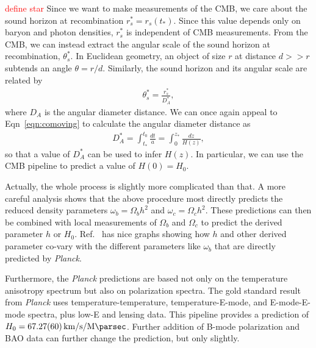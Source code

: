 \documentclass[12pt]{article}
\newcommand{\units}{\kilo\meter\per\second\per\mega\parsec}
\newcommand{\hnaught}[1]{\SI{#1}{\units}}
\newcommand{\note}[1]{\textcolor{red}{#1}}
\newcommand{\Planck}[1]{\textit{Planck}}
\begin{document}
\note{define star}
Since we want to make measurements of the CMB, we care about the sound horizon at recombination $r_s^*=r_s(t_*)$. Since this value depends only on baryon and photon densities, $r^*_s$ is independent of CMB measurements. From the CMB, we can instead extract the angular scale of the sound horizon at recombination, $\theta_s^*$. 
In Euclidean geometry, an object of size $r$ at distance $d>>r$ subtends an angle $\theta = r/d$.
Similarly, the sound horizon and its angular scale are related by
\begin{align}
\theta_s^* = \frac{r_s^*}{D_A^*},
\end{align}
where $D_A$ is the angular diameter distance.
We can once again appeal to Eqn~\ref{eqn:comoving} to calculate the angular diameter distance as~\cite{Samtleben2007, DiValentino2021}
\begin{align}
D_A^* = \int_{t_*}^{t_0}\frac{dt}{a} =  \int_0^{z_*}\frac{dz}{H(z)}, \label{eqn:distance}
\end{align}
so that a value of $D_A^*$ can be used to infer $H(z)$. In particular, we can use the CMB pipeline to predict a value of $H(0) = H_0$.

Actually, the whole process is slightly more complicated than that. A more careful analysis shows that the above procedure most directly predicts the reduced density parameters $\omega_b = \Omega_bh^2$ and $\omega_c = \Omega_c h^2$. These predictions can then be combined with local measurements of $\Omega_b$ and $\Omega_c$ to predict the derived parameter $h$ or $H_0$. Ref.~\cite{Planck2018} has nice graphs showing how $h$ and other derived parameter co-vary with the different parameters like $\omega_b$ that are directly predicted by \textit{Planck}. 

Furthermore, the \Planck{} predictions are based not only on the temperature anisotropy spectrum but also on polarization spectra. The gold standard result from \Planck{} uses temperature-temperature, temperature-E-mode, and E-mode-E-mode spectra, plus low-E and lensing data. This pipeline provides a prediction of ${H_0 = \hnaught{67.27 \pm 0.6}}$. Further addition of B-mode polarization and BAO data can further change the prediction, but only slightly.
\end{document}

